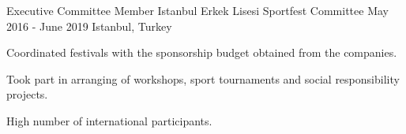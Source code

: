 
\begin{cventries}

  \cventry
    {Executive Committee Member}
    {Istanbul Erkek Lisesi Sportfest Committee}
    {May 2016 - June 2019}
    {Istanbul, Turkey}
    {
    \begin{cvitems}
        \item {Coordinated festivals with the sponsorship budget obtained from the companies.}
        \item {Took part in arranging of workshops, sport tournaments and social responsibility projects.}
        \item {High number of international participants.}
    \end{cvitems}
    }

\end{cventries}
